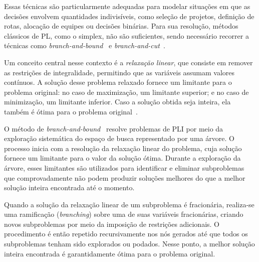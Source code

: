 Essas técnicas são particularmente adequadas para modelar situações em que as decisões envolvem quantidades indivisíveis, como seleção de projetos, definição de rotas, alocação de equipes ou decisões binárias. Para sua resolução, métodos clássicos de PL, como o simplex, não são suficientes, sendo necessário recorrer a técnicas como \emph{branch-and-bound}~\cite{Wosley1998} e \emph{branch-and-cut}~\cite{Bertsimas2005}.

Um conceito central nesse contexto é a \emph{relaxação linear}, que consiste em remover as restrições de integralidade, permitindo que as variáveis assumam valores contínuos. A solução desse problema relaxado fornece um limitante para o problema original: no caso de maximização, um limitante superior; e no caso de minimização, um limitante inferior. Caso a solução obtida seja inteira, ela também é ótima para o problema original~\cite{Nemhauser1988}.

O método de \emph{branch-and-bound}~\cite{Wosley1998} resolve problemas de PLI por meio da exploração sistemática do espaço de busca representado por uma árvore. O processo inicia com a resolução da relaxação linear do problema, cuja solução fornece um limitante para o valor da solução ótima. Durante a exploração da árvore, esses limitantes são utilizados para identificar e eliminar subproblemas que comprovadamente não podem produzir soluções melhores do que a melhor solução inteira encontrada até o momento.

Quando a solução da relaxação linear de um subproblema é fracionária, realiza-se uma ramificação (\emph{branching}) sobre uma de suas variáveis fracionárias, criando novos subproblemas por meio da imposição de restrições adicionais. O procedimento é então repetido recursivamente nos nós gerados até que todos os subproblemas tenham sido explorados ou podados. Nesse ponto, a melhor solução inteira encontrada é garantidamente ótima para o problema original.




